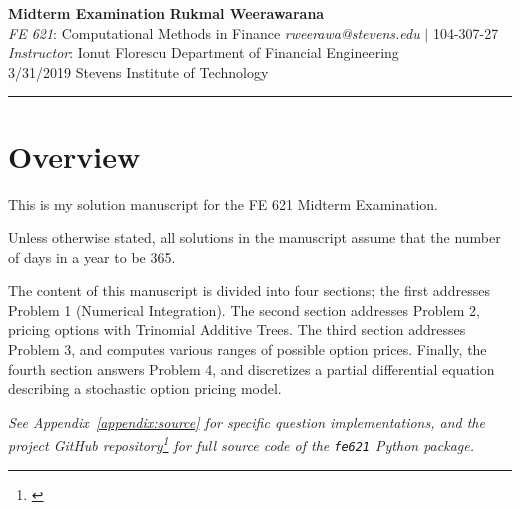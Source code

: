 \documentclass[10pt]{article}
\begin{document}
\thispagestyle{plain}



\noindent
\large\textbf{Midterm Examination} \hfill \textbf{Rukmal Weerawarana} \\
\normalsize \textit{FE 621}: Computational Methods in Finance \hfill \textit{rweerawa@stevens.edu} $\mid$ 104-307-27 \\
\textit{Instructor}: Ionut Florescu \hfill Department of Financial Engineering \\
3/31/2019 \hfill Stevens Institute of Technology

\noindent\rule{\linewidth}{.1em}



\section*{Overview}

This is my solution manuscript for the FE 621 Midterm Examination.

Unless otherwise stated, all solutions in the manuscript assume that the number of days in a year to be 365.

The content of this manuscript is divided into four sections; the first addresses Problem 1 (Numerical Integration). The second section addresses Problem 2, pricing options with Trinomial Additive Trees. The third section addresses Problem 3, and computes various ranges of possible option prices. Finally, the fourth section answers Problem 4, and discretizes a partial differential equation describing a stochastic option pricing model.

\begin{center}
    \textit{See Appendix~\ref{appendix:source} for specific question implementations, and the project GitHub repository\footnote{\cite{Weerawarana2019}} for full source code of the {\normalfont \texttt{fe621}} Python package.}
\end{center}



\newpage

\tableofcontents

\end{document}
